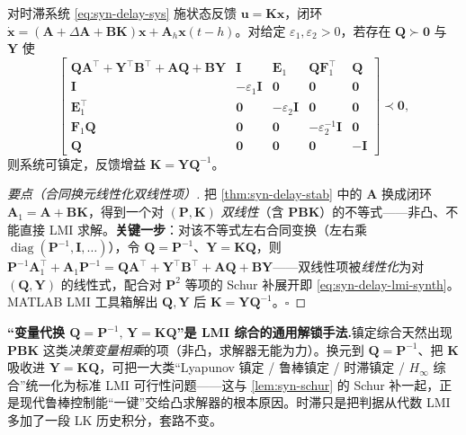 \begin{theorem}
\label{thm:syn-delay-synth}
对时滞系统 \cref{eq:syn-delay-sys} 施状态反馈 $\mathbf u=\mathbf K\mathbf x$，闭环 $\dot{\mathbf x}=(\mathbf A+\Delta\mathbf A+\mathbf B\mathbf K)\mathbf x+\mathbf A_h\mathbf x(t-h)$。对给定 $\varepsilon_1,\varepsilon_2>0$，若存在 $\mathbf Q\succ\mathbf 0$ 与 $\mathbf Y$ 使
\begin{equation}
  \begin{bmatrix}\mathbf Q\mathbf A^\top+\mathbf Y^\top\mathbf B^\top+\mathbf A\mathbf Q+\mathbf B\mathbf Y & \mathbf I & \mathbf E_1 & \mathbf Q\mathbf F_1^\top & \mathbf Q\\ \mathbf I & -\varepsilon_1\mathbf I & \mathbf 0 & \mathbf 0 & \mathbf 0\\ \mathbf E_1^\top & \mathbf 0 & -\varepsilon_2\mathbf I & \mathbf 0 & \mathbf 0\\ \mathbf F_1\mathbf Q & \mathbf 0 & \mathbf 0 & -\varepsilon_2^{-1}\mathbf I & \mathbf 0\\ \mathbf Q & \mathbf 0 & \mathbf 0 & \mathbf 0 & -\mathbf I\end{bmatrix}\prec\mathbf 0,
  \label{eq:syn-delay-lmi-synth}
\end{equation}
则系统可镇定，反馈增益 $\mathbf K=\mathbf Y\mathbf Q^{-1}$。
\end{theorem}
\begin{proof}[要点（合同换元线性化双线性项）]
把 \cref{thm:syn-delay-stab} 中的 $\mathbf A$ 换成闭环 $\mathbf A_1=\mathbf A+\mathbf B\mathbf K$，得到一个对 $(\mathbf P,\mathbf K)$ \emph{双线性}（含 $\mathbf P\mathbf B\mathbf K$）的不等式——非凸、不能直接 LMI 求解。\textbf{关键一步}：对该不等式左右合同变换（左右乘 $\operatorname{diag}(\mathbf P^{-1},\mathbf I,\dots)$），令 $\mathbf Q=\mathbf P^{-1}$、$\mathbf Y=\mathbf K\mathbf Q$，则 $\mathbf P^{-1}\mathbf A_1^\top+\mathbf A_1\mathbf P^{-1}=\mathbf Q\mathbf A^\top+\mathbf Y^\top\mathbf B^\top+\mathbf A\mathbf Q+\mathbf B\mathbf Y$——双线性项被\emph{线性化}为对 $(\mathbf Q,\mathbf Y)$ 的线性式，配合对 $\mathbf P^2$ 等项的 Schur 补展开即 \cref{eq:syn-delay-lmi-synth}。MATLAB LMI 工具箱解出 $\mathbf Q,\mathbf Y$ 后 $\mathbf K=\mathbf Y\mathbf Q^{-1}$。\hfill$\square$
\end{proof}

\begin{insight}
\textbf{“变量代换 $\mathbf Q=\mathbf P^{-1},\,\mathbf Y=\mathbf K\mathbf Q$”是 LMI 综合的通用解锁手法.}\;镇定综合天然出现 $\mathbf P\mathbf B\mathbf K$ 这类\emph{决策变量相乘}的项（非凸，求解器无能为力）。换元到 $\mathbf Q=\mathbf P^{-1}$、把 $\mathbf K$ 吸收进 $\mathbf Y=\mathbf K\mathbf Q$，可把一大类“Lyapunov 镇定 / 鲁棒镇定 / 时滞镇定 / $H_\infty$ 综合”统一化为标准 LMI 可行性问题——这与 \cref{lem:syn-schur} 的 Schur 补一起，正是现代鲁棒控制能“一键”交给凸求解器的根本原因。时滞只是把判据从代数 LMI 多加了一段 LK 历史积分，套路不变。
\end{insight}

